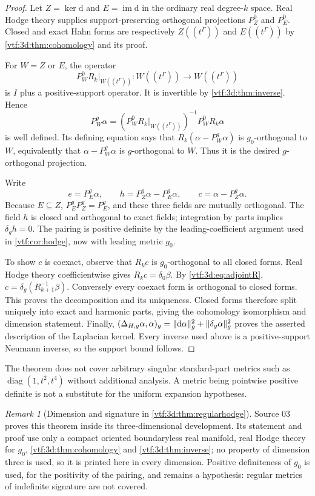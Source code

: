 \documentclass[11pt,letterpaper]{article}
\theoremstyle{definition}
\theoremstyle{remark}
\newtheorem{remark}[theorem]{Remark}
\newcommand{\im}{\operatorname{im}}
\newcommand{\dd}{\mathrm d}
\begin{document}
\begin{proof}
Let $Z=\ker\dd$ and $E=\im\dd$ in the ordinary real degree-$k$ space. Real Hodge theory supplies support-preserving orthogonal projections $P_Z^0$ and $P_E^0$. Closed and exact Hahn forms are respectively $Z((t^\Gamma))$ and $E((t^\Gamma))$ by \cref{vtf:3d:thm:cohomology} and its proof.

For $W=Z$ or $E$, the operator
\[
 P_W^0R_k\big|_{W((t^\Gamma))}:W((t^\Gamma))\to W((t^\Gamma))
\]
is $I$ plus a positive-support operator. It is invertible by \cref{vtf:3d:thm:inverse}. Hence
\[
 P_W^g\alpha=
 \left(P_W^0R_k\big|_{W((t^\Gamma))}\right)^{-1}P_W^0R_k\alpha
\]
is well defined. Its defining equation says that $R_k(\alpha-P_W^g\alpha)$ is $g_0$-orthogonal to $W$, equivalently that $\alpha-P_W^g\alpha$ is $g$-orthogonal to $W$. Thus it is the desired $g$-orthogonal projection.

Write
\[
 e=P_E^g\alpha,\qquad
 h=P_Z^g\alpha-P_E^g\alpha,\qquad
 c=\alpha-P_Z^g\alpha.
\]
Because $E\subseteq Z$, $P_E^gP_Z^g=P_E^g$, and these three fields are mutually orthogonal. The field $h$ is closed and orthogonal to exact fields; integration by parts implies $\delta_gh=0$. The pairing is positive definite by the leading-coefficient argument used in \cref{vtf:cor:hodge}, now with leading metric $g_0$.

To show $c$ is coexact, observe that $R_kc$ is $g_0$-orthogonal to all closed forms. Real Hodge theory coefficientwise gives $R_kc=\delta_0\beta$. By \eqref{vtf:3d:eq:adjointR},
$c=\delta_g(R_{k+1}^{-1}\beta)$. Conversely every coexact form is orthogonal to closed forms. This proves the decomposition and its uniqueness. Closed forms therefore split uniquely into exact and harmonic parts, giving the cohomology isomorphism and dimension statement. Finally,
$(\Delta_{H,g}\alpha,\alpha)_g=\norm{\dd\alpha}_g^2+\norm{\delta_g\alpha}_g^2$ proves the asserted description of the Laplacian kernel. Every inverse used above is a positive-support Neumann inverse, so the support bound follows.
\end{proof}
The theorem does not cover arbitrary singular standard-part metrics such as $\operatorname{diag}(1,t^2,t^4)$ without additional analysis. A metric being pointwise positive definite is not a substitute for the uniform expansion hypotheses.

\begin{remark}[Dimension and signature in \cref{vtf:3d:thm:regularhodge}]
Source 03 proves this theorem inside its three-dimensional development. Its
statement and proof use only a compact oriented boundaryless real manifold, real
Hodge theory for $g_0$, \cref{vtf:3d:thm:cohomology} and
\cref{vtf:3d:thm:inverse}; no property of dimension three is used, so it is
printed here in every dimension. Positive definiteness of $g_0$ is used, for the
positivity of the pairing, and remains a hypothesis: regular metrics of
indefinite signature are not covered.
\end{remark}
\end{document}
